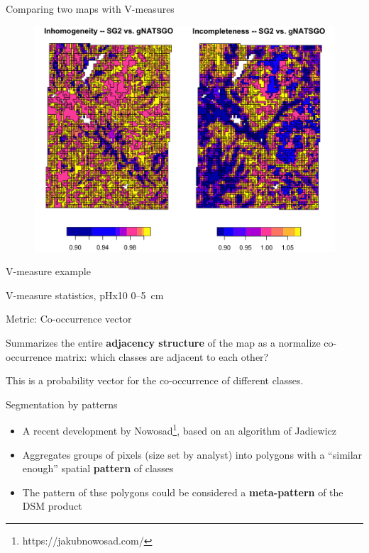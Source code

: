 \documentclass[aspectratio=169]{beamer}
\begin{document}
\begin{frame}{Comparing two maps with V-measures}
    \begin{figure}
        \centering        \includegraphics[height=0.72\textheight]{graphics_david/Fig16.png}
    \end{figure}
\end{frame}


\begin{frame}{V-measure example}
   
\par
V-measure statistics, pHx10 0--5~cm
\end{frame}

\begin{frame}{Metric: Co-occurrence vector}
\par
    Summarizes the entire \textbf{adjacency structure} of the map as a normalize co-occurrence matrix: which classes are adjacent to each other?
  \par  
    This is a probability vector for the co-occurrence of different classes.
\end{frame}

\begin{frame}{Segmentation by patterns}
\begin{itemize}
    \item 
A recent development by Nowosad\footnote{https://jakubnowosad.com/}, based on an algorithm of Jadiewicz    
\item Aggregates groups of pixels (size set by analyst) into polygons with a ``similar enough'' spatial \textbf{pattern} of classes
\item The pattern of thse polygons could be considered a \textbf{meta-pattern} of the DSM product
\end{itemize}
\end{frame}
\end{document}
